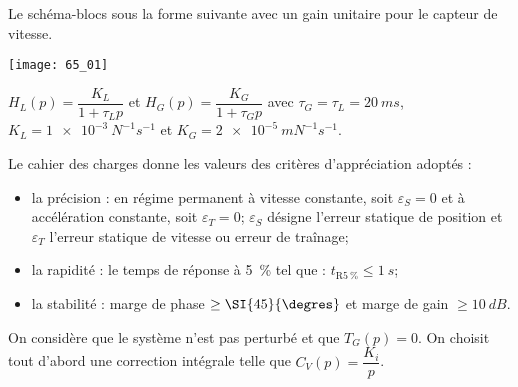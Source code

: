 \normaltrue \difficilefalse \tdifficilefalse
\correctionfalse

\setcounter{question}{0}


\ifcorrection
\else
{}
\fi

\ifprof
\else
Le schéma-blocs sous la forme suivante avec un gain unitaire pour le capteur
de vitesse.

\begin{center}
\texttt{[image: 65\_01]}
\end{center}

$H_L(p)=\dfrac{K_L}{1+\tau_L p}$ et $H_G(p)=\dfrac{K_G}{1+\tau_G p}$  avec $\tau_G=\tau_L = \SI{20}{ms}$, $K_L = \SI{1e-3}{N^{-1}s^{-1}}$ et $K_G = \SI{2e-5}{mN^{-1}s^{-1}}$.


Le cahier des charges donne les valeurs des critères d'appréciation adoptés :
\begin{itemize}
\item la précision : en régime permanent à vitesse constante, soit $\varepsilon_S=0$ et à accélération constante, soit $\varepsilon_T=0$; $\varepsilon_S$ désigne l'erreur statique de position et $\varepsilon_T$ l'erreur statique de vitesse ou erreur de traînage;
\item la rapidité : le temps de réponse à \SI{5}{\%} tel que : $t_{\text{R}\SI{5}{\%}}\leq \SI{1}{s}$;
\item la stabilité : marge de phase $\geq \SI{45}{\degres}$ et marge de gain $\geq \SI{10}{dB}$.
\end{itemize}

On considère que le système n'est pas perturbé et que $T_G(p)=0$.
On choisit tout d'abord une correction intégrale telle que $C_V(p)=\dfrac{K_i}{p}$.
\fi

\ifprof
\else 
\fi

\ifprof
\else 
\fi


